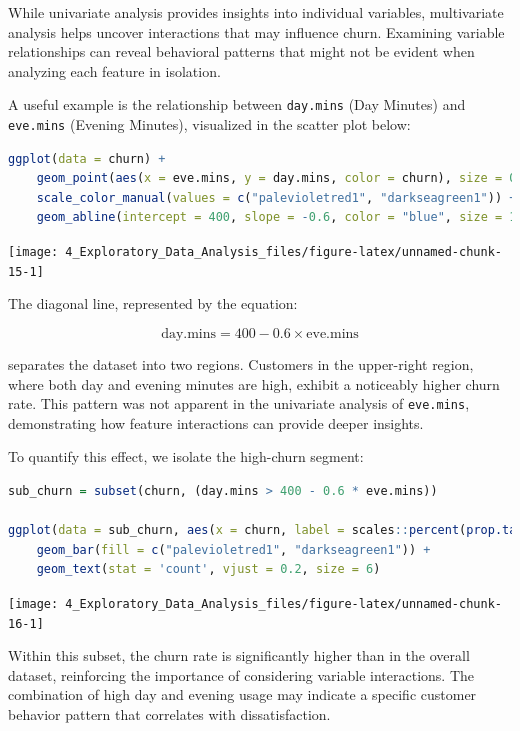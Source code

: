 \documentclass[
  11pt,
]{book}
\newcommand{\passthrough}[1]{#1}
\theoremstyle{definition}
\theoremstyle{definition}
\theoremstyle{definition}
\theoremstyle{definition}
\theoremstyle{remark}
\begin{document}
While univariate analysis provides insights into individual variables, multivariate analysis helps uncover interactions that may influence churn. Examining variable relationships can reveal behavioral patterns that might not be evident when analyzing each feature in isolation.

A useful example is the relationship between \passthrough{\lstinline!day.mins!} (Day Minutes) and \passthrough{\lstinline!eve.mins!} (Evening Minutes), visualized in the scatter plot below:

\begin{lstlisting}[language=R]
ggplot(data = churn) +
    geom_point(aes(x = eve.mins, y = day.mins, color = churn), size = 0.7, alpha = 0.8) +
    scale_color_manual(values = c("palevioletred1", "darkseagreen1")) +
    geom_abline(intercept = 400, slope = -0.6, color = "blue", size = 1)
\end{lstlisting}

\begin{center}\texttt{[image: 4\_Exploratory\_Data\_Analysis\_files/figure-latex/unnamed-chunk-15-1]} \end{center}

The diagonal line, represented by the equation:

\[
\text{day.mins} = 400 - 0.6 \times \text{eve.mins}
\]

separates the dataset into two regions. Customers in the upper-right region, where both day and evening minutes are high, exhibit a noticeably higher churn rate. This pattern was not apparent in the univariate analysis of \passthrough{\lstinline!eve.mins!}, demonstrating how feature interactions can provide deeper insights.

To quantify this effect, we isolate the high-churn segment:

\begin{lstlisting}[language=R]
sub_churn = subset(churn, (day.mins > 400 - 0.6 * eve.mins))

ggplot(data = sub_churn, aes(x = churn, label = scales::percent(prop.table(stat(count))))) +
    geom_bar(fill = c("palevioletred1", "darkseagreen1")) + 
    geom_text(stat = 'count', vjust = 0.2, size = 6)
\end{lstlisting}

\begin{center}\texttt{[image: 4\_Exploratory\_Data\_Analysis\_files/figure-latex/unnamed-chunk-16-1]} \end{center}

Within this subset, the churn rate is significantly higher than in the overall dataset, reinforcing the importance of considering variable interactions. The combination of high day and evening usage may indicate a specific customer behavior pattern that correlates with dissatisfaction.
\end{document}
